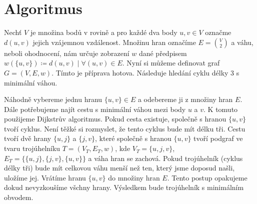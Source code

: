 \section{Algoritmus}
\label{sec:algoritmus}

Nechť $V$ je množina bodů v rovině a pro každé dva body $u, v \in V$ označme $d(u, v)$ jejich vzájemnou vzdálenost. Množinu hran označíme $E = \binom{V}{2}$ a váhu, neboli ohodnocení, nám určuje zobrazení $w$ dané předpisem $w(\{u, v\}) \coloneqq d(u, v)\mid \forall (u, v) \in E$. Nyní si můžeme definovat graf $G = (V, E, w)$. Tímto je příprava hotova. Následuje hledání cyklu délky 3 s minimální váhou.

Náhodně vybereme jednu hranu $\{u, v\} \in E$ a odebereme ji z množiny hran $E$. Dále potřebujeme najít cestu s minimální váhou mezi body $u$ a  $v$. K tomuto použijeme Dijkstrův algoritmus. Pokud cesta existuje, společně s hranou $\{u, v\}$ tvoří cyklus. Není těžké si rozmyslet, že tento cyklus bude mít délku tři. Cestu tvoří dvě hrany $\{u, j\}$ a $\{j, v\}$, které společně s hranou $\{u, v\}$ tvoří podgraf ve tvaru trojúhelníku $T = (V_T, E_T, w)$, kde $V_T = \{u, j, v\}$, $E_T = \{\{u,j\}, \{j,v\}, \{u,v\}\}$ a váha hran se zachová. Pokud trojúhelník (cyklus délky tři) bude mít celkovou váhu menší než ten, který jsme doposud našli, uložíme jej.
Vrátíme hranu $\{u, v\}$ do množiny hran $E$. Tento postup opakujeme dokud nevyzkoušíme všchny hrany. Výsledkem bude trojúhelník s minimálním obvodem.


